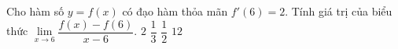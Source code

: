 
\begin{ex}%
	Cho hàm số $y=f(x)$ có đạo hàm thỏa  mãn $f'(6)=2$. Tính giá trị của biểu thức $\lim\limits_{ x \to 6}\dfrac{ f(x)-f(6)}{x-6}$.
	 \choice
		{\True $2$} 
		{$\dfrac{1}{3}$} 
		 {$\dfrac{1}{2}$}
		{$12$} 
\end{ex}
